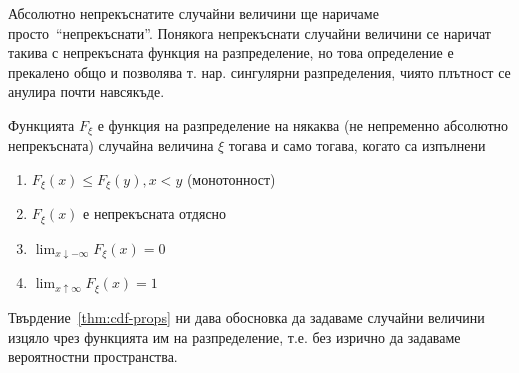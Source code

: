 \documentclass[numbers=endperiod, DIV=15, bibliography=totocnumbered]{scrartcl}
\begin{document}
\begin{note}
  Абсолютно непрекъснатите случайни величини ще наричаме просто~\enquote{непрекъснати}. Понякога непрекъснати случайни величини се наричат такива с непрекъсната функция на разпределение, но това определение е прекалено общо и позволява т. нар. сингулярни разпределения, чиято плътност се анулира почти навсякъде.
\end{note}

\begin{proposition}\label{thm:cdf-props}
  Функцията $F_\xi$ е функция на разпределение на някаква (не непременно абсолютно непрекъсната) случайна величина $\xi$ тогава и само тогава, когато са изпълнени
  \begin{enumerate}
    \item $F_\xi(x) \leq F_\xi(y), x < y$ (монотонност)
    \item $F_\xi(x)$ е непрекъсната отдясно
    \item $\lim_{x \downarrow -\infty} F_\xi(x) = 0$
    \item $\lim_{x \uparrow \infty} F_\xi(x) = 1$
  \end{enumerate}
\end{proposition}

Твърдение~\ref{thm:cdf-props} ни дава обосновка да задаваме случайни величини изцяло чрез функцията им на разпределение, т.е. без изрично да задаваме вероятностни пространства.
\end{document}
